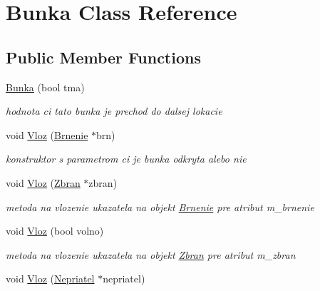 \hypertarget{class_bunka}{\section{Bunka Class Reference}
\label{class_bunka}
}
\subsection*{Public Member Functions}
\begin{DoxyCompactItemize}
\item 
\hypertarget{class_bunka_acd2f66e8fd55e45b785381d7868d4e10}{\hyperlink{class_bunka_acd2f66e8fd55e45b785381d7868d4e10}{Bunka} (bool tma)}\label{class_bunka_acd2f66e8fd55e45b785381d7868d4e10}

\begin{DoxyCompactList}\small\item\em hodnota ci tato bunka je prechod do dalsej lokacie \end{DoxyCompactList}\item 
\hypertarget{class_bunka_af30cb993f4512b5dfffb90cf3741cfeb}{void \hyperlink{class_bunka_af30cb993f4512b5dfffb90cf3741cfeb}{Vloz} (\hyperlink{class_brnenie}{Brnenie} $\ast$brn)}\label{class_bunka_af30cb993f4512b5dfffb90cf3741cfeb}

\begin{DoxyCompactList}\small\item\em konstruktor s parametrom ci je bunka odkryta alebo nie \end{DoxyCompactList}\item 
\hypertarget{class_bunka_a5f75753726525606914d3166037eaf59}{void \hyperlink{class_bunka_a5f75753726525606914d3166037eaf59}{Vloz} (\hyperlink{class_zbran}{Zbran} $\ast$zbran)}\label{class_bunka_a5f75753726525606914d3166037eaf59}

\begin{DoxyCompactList}\small\item\em metoda na vlozenie ukazatela na objekt \hyperlink{class_brnenie}{Brnenie} pre atribut m\-\_\-brnenie \end{DoxyCompactList}\item 
\hypertarget{class_bunka_ac6e111643563817eec785e6461516887}{void \hyperlink{class_bunka_ac6e111643563817eec785e6461516887}{Vloz} (bool volno)}\label{class_bunka_ac6e111643563817eec785e6461516887}

\begin{DoxyCompactList}\small\item\em metoda na vlozenie ukazatela na objekt \hyperlink{class_zbran}{Zbran} pre atribut m\-\_\-zbran \end{DoxyCompactList}\item 
\hypertarget{class_bunka_ac21673745a37f9ccee9591348a1a1213}{void \hyperlink{class_bunka_ac21673745a37f9ccee9591348a1a1213}{Vloz} (\hyperlink{class_nepriatel}{Nepriatel} $\ast$nepriatel)}\label{class_bunka_ac21673745a37f9ccee9591348a1a1213}


\end{DoxyCompactItemize}

